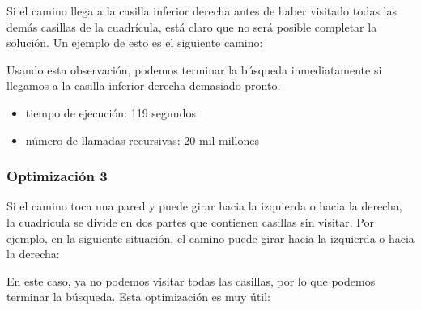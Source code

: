 Si el camino llega a la casilla inferior derecha
antes de haber visitado todas las demás casillas de la cuadrícula,
está claro que
no será posible completar la solución.
Un ejemplo de esto es el siguiente camino:

\begin{center}
\end{center}
Usando esta observación, podemos terminar la búsqueda
inmediatamente si llegamos a la casilla inferior derecha demasiado pronto.

\begin{itemize}[itemsep=0em,topsep=0.5em]
    \item tiempo de ejecución: 119 segundos
    \item número de llamadas recursivas: 20 mil millones
\end{itemize}

\subsubsection{Optimización 3}

Si el camino toca una pared
y puede girar hacia la izquierda o hacia la derecha,
la cuadrícula se divide en dos partes
que contienen casillas sin visitar.
Por ejemplo, en la siguiente situación,
el camino puede girar hacia la izquierda o hacia la derecha:

\begin{center}
\end{center}
En este caso, ya no podemos visitar todas las casillas,
por lo que podemos terminar la búsqueda.
Esta optimización es muy útil:

